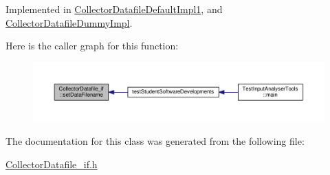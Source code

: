 Implemented in \hyperlink{class_collector_datafile_default_impl1_a62352f75a7635654108bb2b8b9604e1d}{Collector\+Datafile\+Default\+Impl1}, and \hyperlink{class_collector_datafile_dummy_impl_aa2f236e5351f9a438aa7cf8734623758}{Collector\+Datafile\+Dummy\+Impl}.



Here is the caller graph for this function\+:\nopagebreak
\begin{figure}[H]
\begin{center}
\leavevmode
\includegraphics[width=350pt]{class_collector_datafile__if_ab826bbf5472a5cfdbf2f2c30273da8eb_icgraph}
\end{center}
\end{figure}




The documentation for this class was generated from the following file\+:\begin{DoxyCompactItemize}
\item 
\hyperlink{_collector_datafile__if_8h}{Collector\+Datafile\+\_\+if.\+h}\end{DoxyCompactItemize}
